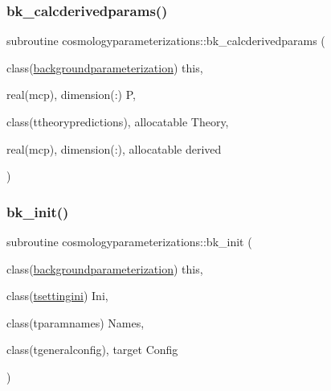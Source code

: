 \subsubsection{\texorpdfstring{bk\+\_\+calcderivedparams()}{bk\_calcderivedparams()}}
{\footnotesize\ttfamily subroutine cosmologyparameterizations\+::bk\+\_\+calcderivedparams (\begin{DoxyParamCaption}\item[{class(\mbox{\hyperlink{structcosmologyparameterizations_1_1backgroundparameterization}{backgroundparameterization}})}]{this,  }\item[{real(mcp), dimension(\+:)}]{P,  }\item[{class(ttheorypredictions), allocatable}]{Theory,  }\item[{real(mcp), dimension(\+:), allocatable}]{derived }\end{DoxyParamCaption})\hspace{0.3cm}{\ttfamily [private]}}

\mbox{\label{namespacecosmologyparameterizations_a8bcd41b19d9c19fa07665660352182b8}} 
\subsubsection{\texorpdfstring{bk\+\_\+init()}{bk\_init()}}
{\footnotesize\ttfamily subroutine cosmologyparameterizations\+::bk\+\_\+init (\begin{DoxyParamCaption}\item[{class(\mbox{\hyperlink{structcosmologyparameterizations_1_1backgroundparameterization}{backgroundparameterization}})}]{this,  }\item[{class(\mbox{\hyperlink{structsettings_1_1tsettingini}{tsettingini}})}]{Ini,  }\item[{class(tparamnames)}]{Names,  }\item[{class(tgeneralconfig), target}]{Config }\end{DoxyParamCaption})}

\mbox{\label{namespacecosmologyparameterizations_a24c7011e1628164c2a2742b41a0fd48e}} 
